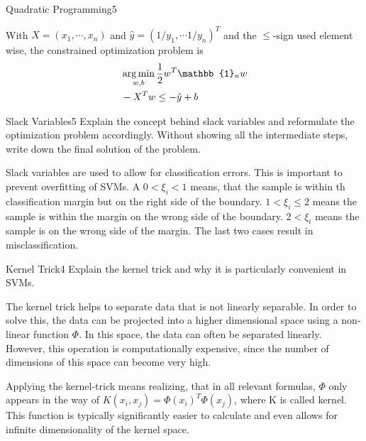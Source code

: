 \begin{questions}
\begin{question}{Quadratic Programming}{5}
\begin{answer}
With $X = (x_1, \cdots, x_n)$ and $\hat{y} = (1/y_1, \cdots 1/y_n)^T$ and the $\leq$-sign used element wise, the constrained optimization problem is 
\begin{align*}
&\argmin_{w,b}{\frac{1}{2} w^T \mathbb{1}_n w}\\
&-X^Tw\leq -\hat{y}+b
\end{align*}
\end{answer}
\end{question}


\begin{question}{Slack Variables}{5}
Explain the concept behind slack variables and reformulate the optimization problem accordingly. Without showing all the intermediate steps, write down the final solution of the problem.

\begin{answer}
Slack variables are used to allow for classification errors. This is important to prevent overfitting of SVMs. A $0<\xi_i<1$ means, that the sample is within th classification margin but on the right side of the boundary. $1<\xi_i \leq 2$ means the sample is within the margin on the wrong side of the boundary. $2<\xi_i$ means the sample is on the wrong side of the margin. The last two cases result in misclassification.

\end{answer}
\end{question}


\begin{question}{Kernel Trick}{4}
Explain the kernel trick and why it is particularly convenient in SVMs.

\begin{answer}
The kernel trick helps to separate data that is not linearly separable. In order to solve this, the data can be projected into a higher dimensional space using a non-linear function $\Phi$. In this space, the data can often be separated linearly. However, this operation is computationally expensive, since the number of dimensions of this space can become very high.

Applying the kernel-trick means realizing, that in all relevant formulas, $\Phi$ only appears in the way of $K(x_i, x_j)=\Phi(x_i)^T \Phi(x_j)$, where K is called kernel. This function is typically significantly easier to calculate and even allows for infinite dimensionality of the kernel space.
\end{answer}
\end{question}


\end{questions}
